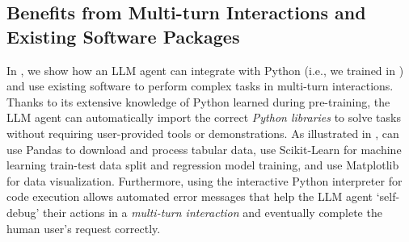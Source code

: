 \subsection{\approach Benefits from Multi-turn Interactions and Existing Software Packages}
\label{sec:multiturn_software_benefit}

In , we show how an LLM agent can integrate with Python (i.e., \modelname we trained in ) and use existing software to perform complex tasks in multi-turn interactions.
%
Thanks to its extensive knowledge of Python learned during pre-training, the LLM agent can automatically import the correct \textit{Python libraries} to solve tasks without requiring user-provided tools or demonstrations.
% 
As illustrated in , \modelname can use Pandas to download and process tabular data, use Scikit-Learn for machine learning train-test data split and regression model training, and use Matplotlib for data visualization.
% 
Furthermore, using the interactive Python interpreter for code execution allows automated error messages that help the LLM agent `self-debug' their actions in a \textit{multi-turn interaction} and eventually complete the human user's request correctly.

